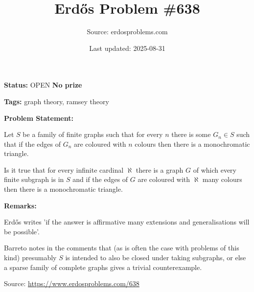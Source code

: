 \documentclass{article}
\title{Erd\H{o}s Problem \#638}
\date{Last updated: 2025-08-31}
\author{Source: erdosproblems.com}
\begin{document}
\maketitle

\noindent\textbf{Status:} OPEN \quad \textbf{No prize}

\noindent\textbf{Tags:} graph theory, ramsey theory

\medskip
\noindent\textbf{Problem Statement:}

Let $S$ be a family of finite graphs such that for every $n$ there is some $G_n\in S$ such that if the edges of $G_n$ are coloured with $n$ colours then there is a monochromatic triangle.

Is it true that for every infinite cardinal $\aleph$ there is a graph $G$ of which every finite subgraph is in $S$ and if the edges of $G$ are coloured with $\aleph$ many colours then there is a monochromatic triangle.

\bigskip
\noindent\textbf{Remarks:}

Erd\H{o}s writes 'if the answer is affirmative many extensions and generalisations will be possible'.

Barreto notes in the comments that (as is often the case with problems of this kind) presumably $S$ is intended to also be closed under taking subgraphs, or else a sparse family of complete graphs gives a trivial counterexample.

\bigskip
\noindent\small{Source: \url{https://www.erdosproblems.com/638}}
\end{document}
